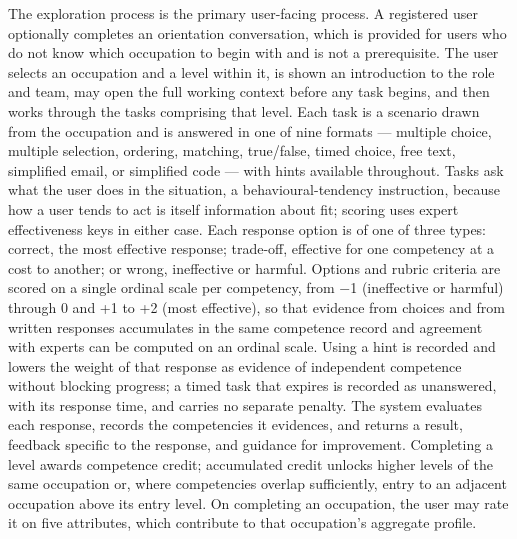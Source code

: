 The exploration process is the primary user-facing process. A registered user optionally completes an orientation conversation, which is provided for users who do not know which occupation to begin with and is not a prerequisite. The user selects an occupation and a level within it, is shown an introduction to the role and team, may open the full working context before any task begins, and then works through the tasks comprising that level. Each task is a scenario drawn from the occupation and is answered in one of nine formats --- multiple choice, multiple selection, ordering, matching, true/false, timed choice, free text, simplified email, or simplified code --- with hints available throughout. Tasks ask what the user does in the situation, a behavioural-\allowbreak{}tendency instruction\cite{r28}, because how a user tends to act is itself information about fit; scoring uses expert effectiveness keys in either case. Each response option is of one of three types: correct, the most effective response; trade-off, effective for one competency at a cost to another; or wrong, ineffective or harmful. Options and rubric criteria are scored on a single ordinal scale per competency, from $-$1 (ineffective or harmful) through 0 and +1 to +2 (most effective), so that evidence from choices and from written responses accumulates in the same competence record and agreement with experts can be computed on an ordinal scale. Using a hint is recorded and lowers the weight of that response as evidence of independent competence without blocking progress; a timed task that expires is recorded as unanswered, with its response time, and carries no separate penalty. The system evaluates each response, records the competencies it evidences, and returns a result, feedback specific to the response, and guidance for improvement. Completing a level awards competence credit; accumulated credit unlocks higher levels of the same occupation or, where competencies overlap sufficiently, entry to an adjacent occupation above its entry level. On completing an occupation, the user may rate it on five attributes, which contribute to that occupation's aggregate profile.

